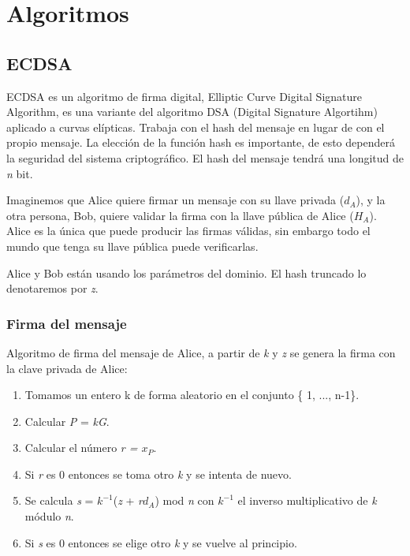 \documentclass[11pt]{article}
\begin{document}
\section{Algoritmos}

\subsection{ECDSA}

ECDSA es un algoritmo de firma digital, Elliptic Curve Digital Signature Algorithm, es una variante del algoritmo DSA (Digital Signature Algortihm) aplicado a curvas elípticas. Trabaja con el hash del mensaje en lugar de con el propio mensaje. La elección de la función hash es importante, de esto dependerá la seguridad del sistema criptográfico. El hash del mensaje tendrá una longitud de \textit{n} bit.

Imaginemos que Alice quiere firmar un mensaje con su llave privada ($d_{A}$), y la otra persona, Bob, quiere validar la firma con la llave pública de Alice ($H_{A}$). Alice es la única que puede producir las firmas válidas, sin embargo todo el mundo que tenga su llave pública puede verificarlas.

Alice y Bob están usando los parámetros del dominio. El hash truncado lo denotaremos por \textit{z}.

\subsubsection*{Firma del mensaje}
Algoritmo de firma del mensaje de Alice, a partir de \textit{k} y \textit{z} se genera la firma con la clave privada de Alice:


\begin{enumerate}
	\item Tomamos un entero k de forma aleatorio en el conjunto \{ 1, ..., n-1\}.
	\item Calcular \textit{P} = \textit{kG}.
	\item Calcular el número \textit{r = $x_{P}$}.
	\item Si \textit{r} es 0 entonces se toma otro \textit{k} y se intenta de nuevo.
	\item Se calcula \textit{s} = \textit{$k^{-1}$}(\textit{z} + \textit{r$d_{A}$}) mod \textit{n}  con \textit{$k^{-1}$} el inverso multiplicativo de \textit{k} módulo \textit{n}.
	\item Si \textit{s} es 0 entonces se elige otro \textit{k} y se vuelve al principio.
\end{enumerate} 
\end{document}
